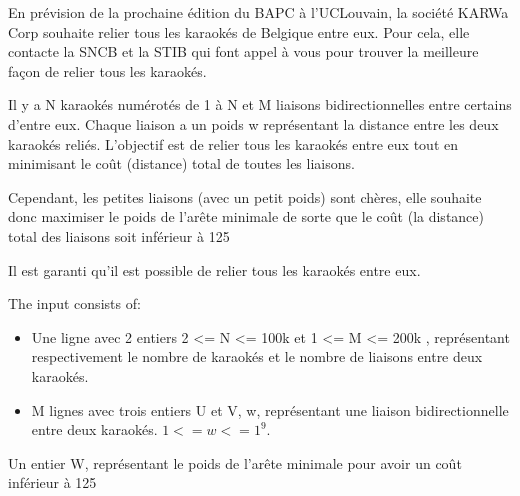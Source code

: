 \problemname{\problemyamlname}


En prévision de la prochaine édition du BAPC à l'UCLouvain, la société KARWa Corp souhaite relier tous les karaokés de Belgique entre eux. Pour cela, elle contacte la SNCB et la STIB qui font appel à vous pour trouver la meilleure façon de relier tous les karaokés.

Il y a N karaokés numérotés de 1 à N et M liaisons bidirectionnelles entre certains d'entre eux. Chaque liaison a un poids w représentant la distance entre les deux karaokés reliés. L'objectif est de relier tous les karaokés entre eux tout en minimisant le coût (distance) total de toutes les liaisons.

Cependant, les petites liaisons (avec un petit poids) sont chères, elle souhaite donc maximiser le poids de l'arête minimale de sorte que le coût (la distance) total des liaisons soit inférieur à 125%

Il est garanti qu'il est possible de relier tous les karaokés entre eux.


\begin{Input}
    The input consists of:
    \begin{itemize}
        \item Une ligne avec 2 entiers 2 <= N <= 100k et 1 <= M <= 200k , représentant respectivement le nombre de karaokés et le nombre de liaisons entre deux karaokés.
        \item M lignes avec trois entiers U et V, w, représentant une liaison bidirectionnelle entre deux karaokés. $1 <= w <= 1^9$.
    \end{itemize}
\end{Input}

\begin{Output}
    Un entier W, représentant le poids de l'arête minimale pour avoir un coût inférieur à 125%
\end{Output}
